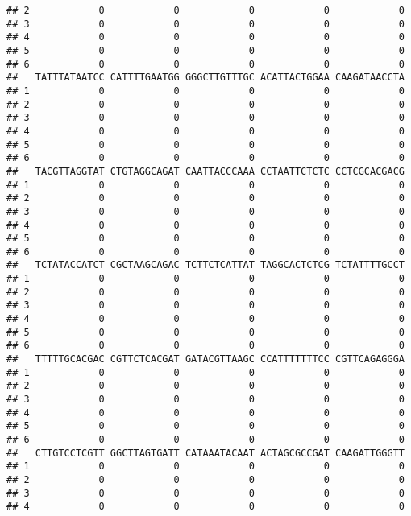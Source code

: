 \documentclass[]{article}
\begin{document}
\begin{verbatim}
## 2            0            0            0            0            0
## 3            0            0            0            0            0
## 4            0            0            0            0            0
## 5            0            0            0            0            0
## 6            0            0            0            0            0
##   TATTTATAATCC CATTTTGAATGG GGGCTTGTTTGC ACATTACTGGAA CAAGATAACCTA
## 1            0            0            0            0            0
## 2            0            0            0            0            0
## 3            0            0            0            0            0
## 4            0            0            0            0            0
## 5            0            0            0            0            0
## 6            0            0            0            0            0
##   TACGTTAGGTAT CTGTAGGCAGAT CAATTACCCAAA CCTAATTCTCTC CCTCGCACGACG
## 1            0            0            0            0            0
## 2            0            0            0            0            0
## 3            0            0            0            0            0
## 4            0            0            0            0            0
## 5            0            0            0            0            0
## 6            0            0            0            0            0
##   TCTATACCATCT CGCTAAGCAGAC TCTTCTCATTAT TAGGCACTCTCG TCTATTTTGCCT
## 1            0            0            0            0            0
## 2            0            0            0            0            0
## 3            0            0            0            0            0
## 4            0            0            0            0            0
## 5            0            0            0            0            0
## 6            0            0            0            0            0
##   TTTTTGCACGAC CGTTCTCACGAT GATACGTTAAGC CCATTTTTTTCC CGTTCAGAGGGA
## 1            0            0            0            0            0
## 2            0            0            0            0            0
## 3            0            0            0            0            0
## 4            0            0            0            0            0
## 5            0            0            0            0            0
## 6            0            0            0            0            0
##   CTTGTCCTCGTT GGCTTAGTGATT CATAAATACAAT ACTAGCGCCGAT CAAGATTGGGTT
## 1            0            0            0            0            0
## 2            0            0            0            0            0
## 3            0            0            0            0            0
## 4            0            0            0            0            0

\end{verbatim}
\end{document}
